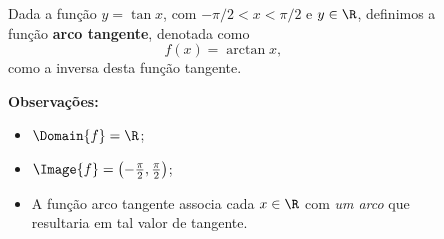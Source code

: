 \begin{frame}
  \begin{columns}[onlytextwidth]
    \begin{column}{0.49\textwidth}\vspace{-0.5cm}
      \begin{definition}
        Dada a função $y=\tan{x}$, com $-\pi/2 < x < \pi/2$ e $y\in\R$, definimos a função \textbf{arco tangente}, denotada como
        \begin{equation*}
          f(x) = \arctan{x},
        \end{equation*}
        como a inversa desta função tangente.
      \end{definition}
      \begin{highlight}
        \textbf{Observações:}
        \vspace{-0.05cm}
        \begin{itemize}
          \item $\Domain{f} = \R$;
          \item $\Image{f} = \left(-\frac{\pi}{2},\frac{\pi}{2}\right)$;
          \item A função arco tangente associa cada $x\in\R$ com \emph{um arco} que resultaria em tal valor de tangente.
        \end{itemize}
      \end{highlight}
    \end{column}
    \begin{column}{0.49\textwidth}\vspace*{-0.5cm}
      \begin{figure}
      \end{figure}
    \end{column}
  \end{columns}
\end{frame}

